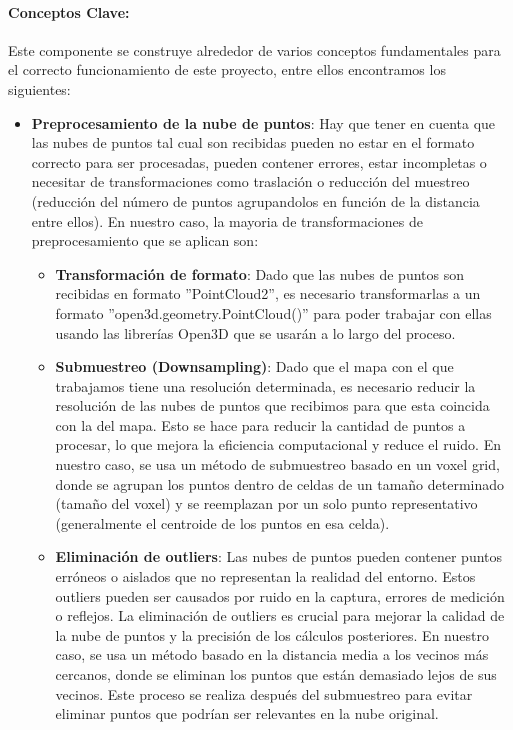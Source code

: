 \documentclass[12pt, a4paper, twoside]{article}
\begin{document}
\paragraph{Conceptos Clave:}
Este componente se construye alrededor de varios conceptos fundamentales para el correcto funcionamiento de este proyecto, entre ellos encontramos los 
siguientes:
\begin{itemize}
  \item \textbf{Preprocesamiento de la nube de puntos}: Hay que tener en cuenta que las nubes de puntos tal cual son recibidas pueden no estar en el formato 
  correcto para ser procesadas, pueden contener errores, estar incompletas o necesitar de transformaciones como traslación o reducción del muestreo (reducción 
  del número de puntos agrupandolos en función de la distancia entre ellos). En nuestro caso, la mayoria de transformaciones de preprocesamiento que se aplican 
  son:
  \begin{itemize}
    \item \textbf{Transformación de formato}: Dado que las nubes de puntos son recibidas en formato ''PointCloud2'', es necesario transformarlas a un formato
      ''open3d.geometry.PointCloud()'' para poder trabajar con ellas usando las librerías Open3D que se usarán a lo largo del proceso. 
      \item \textbf{Submuestreo (Downsampling)}: Dado que el mapa con el que trabajamos tiene una resolución determinada, es necesario reducir la resolución de
      las nubes de puntos que recibimos para que esta coincida con la del mapa. Esto se hace para reducir la cantidad de puntos a procesar, lo que mejora la 
      eficiencia computacional y reduce el ruido. En nuestro caso, se usa un método de submuestreo basado en un voxel grid, donde se agrupan los puntos dentro 
      de celdas de un tamaño determinado (tamaño del voxel) y se reemplazan por un solo punto representativo (generalmente el centroide de los puntos en esa celda).
      \item \textbf{Eliminación de outliers}: Las nubes de puntos pueden contener puntos erróneos o aislados que no representan la realidad del entorno. Estos outliers 
      pueden ser causados por ruido en la captura, errores de medición o reflejos. La eliminación de outliers es crucial para mejorar la calidad de la nube de puntos y 
      la precisión de los cálculos posteriores. En nuestro caso, se usa un método basado en la distancia media a los vecinos más cercanos, donde se eliminan los puntos 
      que están demasiado lejos de sus vecinos. Este proceso se realiza después del submuestreo para evitar eliminar puntos que podrían ser relevantes en la nube original.

\end{itemize}
\end{itemize}
\end{document}
